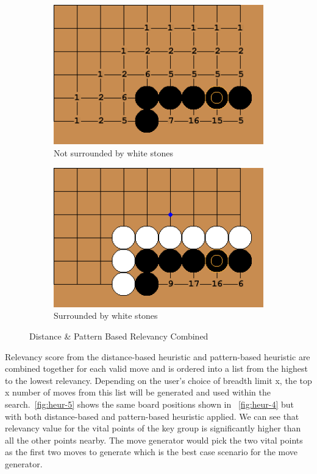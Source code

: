 \documentclass{l4proj}
\begin{document}
\begin{figure}[!ht]
\centering
\begin{subfigure}[b]{0.35\textwidth}
\centering
\includegraphics[width=\textwidth]{heur/5a.png}
\caption{Not surrounded by white stones}
\label{fig:heur-5a}
\end{subfigure}\qquad
\begin{subfigure}[b]{0.35\textwidth}
\centering
\includegraphics[width=\textwidth]{heur/5b.png}
\caption{Surrounded by white stones}
\label{fig:heur-5b}
\end{subfigure}
\caption{Distance \& Pattern Based Relevancy Combined}
\label{fig:heur-5}
\end{figure}


Relevancy score from the distance-based heuristic and pattern-based heuristic are combined together for each valid move and is ordered into a list from the highest to the lowest relevancy.  Depending on the user’s choice of breadth limit x,  the top x number of moves from this list will be generated and used  within the search.~\autoref{fig:heur-5} shows the same board positions shown in  ~\autoref{fig:heur-4} but with both distance-based and pattern-based heuristic applied. We can see that relevancy value for the vital points of the key group is significantly higher than all the other points nearby. The move generator would pick the two vital points as the first two moves to generate which is the best case scenario for the move generator.
\end{document}
